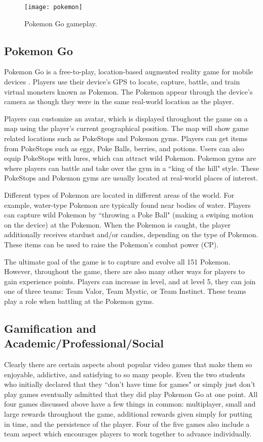 \begin{figure}[h]
\centering
\texttt{[image: pokemon]}
\caption{Pokemon Go gameplay.}
\end{figure}	
\subsection{Pokemon Go}
Pokemon Go is a free-to-play, location-based augmented reality game for mobile devices  \cite{PokemonGo}. Players use their device's GPS to locate, capture, battle, and train virtual monsters known as Pokemon. The Pokemon appear through the device's camera as though they were in the same real-world location as the player. 

Players can customize an avatar, which is displayed throughout the game on a map using the player's current geographical position. The map will show game related locations such as PokeStops and Pokemon gyms. Players can get items from PokeStops such as eggs, Poke Balls, berries, and potions. Users can also equip PokeStops with lures, which can attract wild Pokemon. Pokemon gyms are where players can battle and take over the gym in a ``king of the hill" style. These PokeStops and Pokemon gyms are usually located at real-world places of interest. 

Different types of Pokemon are located in different areas of the world. For example, water-type Pokemon are typically found near bodies of water. Players can capture wild Pokemon by ``throwing a Poke Ball" (making a swiping motion on the device) at the Pokemon. When the Pokemon is caught, the player additionally receives stardust and/or candies, depending on the type of Pokemon. These items can be used to raise the Pokemon's combat power (CP). 

The ultimate goal of the game is to capture and evolve all 151 Pokemon. However, throughout the game, there are also many other ways for players to gain experience points. Players can increase in level, and at level 5, they can join one of three teams: Team Valor, Team Mystic, or Team Instinct. These teams play a role when battling at the Pokemon gyms. 

\subsection{Gamification and Academic/Professional/Social}
Clearly there are certain aspects about popular video games that make them so enjoyable, addictive, and satisfying to so many people. Even the two students who initially declared that they ``don't have time for games" or simply just don't play games eventually admitted that they did play Pokemon Go at one point. All four games discussed above have a few things in common: multiplayer, small and large rewards throughout the game, additional rewards given simply for putting in time, and the persistence of the player. Four of the five games also include a team aspect which encourages players to work together to advance individually. 

